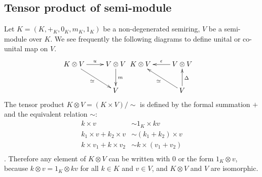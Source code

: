 \subsection{Tensor product of semi-module} %
\label{sec:tensor.product.of.semi-module}
Let $K=(K,+_K,0_K,m_K,1_K)$ be a non-degenerated semiring, 
$V$ be a semi-module over $K$. We see frequently the following diagrams 
to define unital or co-unital map on $V$.
\begin{equation}\xymatrix{
	K \otimes V \ar[r]^{u} \ar[dr]_{\simeq} & V \otimes V \ar[d]^{m} \\
	& V
}\xymatrix{
	K \otimes V \ar@{<-}[r]^{\epsilon} \ar@{<-}[dr]_{\simeq} & V \otimes V \ar@{<-}[d]^{\Delta} \\
	& V
}\quad\xymatrix{
}\end{equation}
The tensor product $K\otimes V=(K\times V)/\sim$ is defined by 
the formal summation $+$ and the equivalent relation $\sim$:
\begin{equation}\begin{split}
	k \times v &\sim 1_K \times kv \\
	k_1 \times v + k_2 \times v &\sim (k_1 + k_2) \times v \\
	k \times v_1 + k \times v_2 &\sim k \times (v_1 + v_2) \\
\end{split}\end{equation}
. Therefore any element of $K\otimes V$ can be written with $0$ or the form
$1_K\otimes v$, because $k\otimes v=1_K\otimes kv$ for all $k\in K$ and 
$v\in V$, and $K\otimes V$ and $V$ are isomorphic.

